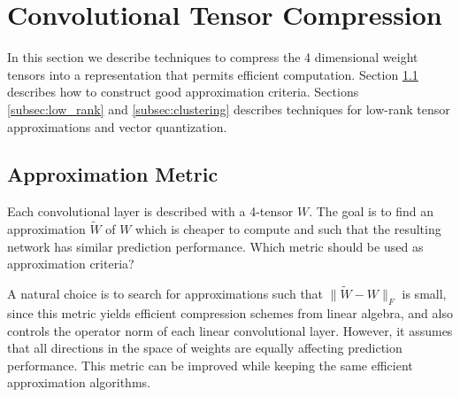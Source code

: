 \section{Convolutional Tensor Compression}\label{sec:approx_tech}
In this section we describe
techniques to compress the
4 dimensional weight tensors into a representation that permits
efficient computation. 
Section \ref{reconstr_sect} describes how to construct good approximation 
criteria. Sections \ref{subsec:low_rank} and \ref{subsec:clustering} 
describes techniques for low-rank tensor
approximations and vector quantization. 





\subsection{Approximation Metric}
\label{reconstr_sect}

Each convolutional layer is described with a 4-tensor $W$. 
The goal is to find an approximation $\widetilde{W}$  of $W$ 
which is cheaper to compute and such that the resulting network
has similar prediction performance. Which metric should be used
as approximation criteria?

A natural choice is to search for approximations such that 
$\| \widetilde{W} - W \|_F$ is small, since this metric yields 
efficient compression schemes from linear algebra, and also controls
the operator norm of each linear convolutional layer.
%
However, it assumes that all directions in the space of weights are equally 
affecting prediction performance. This metric can be improved while 
keeping the same efficient approximation algorithms.

